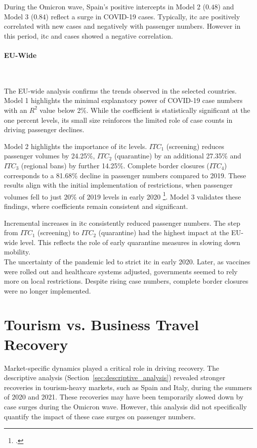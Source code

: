 \documentclass[12pt,onehalfspacing,headsepline,oneside,openright,a4paper, fleqn]{report}
\begin{document}
During the Omicron wave, Spain's positive intercepts in Model 2 ($0.48$) and Model 3 ($0.84$) reflect a surge in COVID-19 cases. Typically, \gls{itc} are positively correlated with new cases and negatively with passenger numbers. However in this period, \gls{itc} and cases showed a negative correlation.

\newpage

\paragraph{EU-Wide}
\

The EU-wide analysis confirms the trends observed in the selected countries. Model 1 highlights the minimal explanatory power of COVID-19 case numbers with an $R^2$ value below 2\%. While the coefficient is statistically significant at the one percent levels, its small size reinforces the limited role of case counts in driving passenger declines.

Model 2 highlights the importance of \gls{itc} levels. $ITC_1$ (screening) reduces passenger volumes by 24.25\%, $ITC_2$ (quarantine) by an additional 27.35\% and $ITC_3$ (regional bans) by further 14.25\%. Complete border closures ($ITC_4$) corresponds to a 81.68\% decline in passenger numbers compared to 2019. These results align with the initial implementation of restrictions, when passenger volumes fell to just 20\% of 2019 levels in early 2020 \footcite[3]{IACUS2020}. Model 3 validates these findings, where coefficients remain consistent and significant.

Incremental increases in \gls{itc} consistently reduced passenger numbers. The step from $ITC_1$ (screening) to $ITC_2$ (quarantine) had the highest impact at the EU-wide level. This reflects the role of early quarantine measures in slowing down mobility. 
\\

The uncertainty of the pandemic led to strict \gls{itc} in early 2020. Later, as vaccines were rolled out and healthcare systems adjusted, governments seemed to rely more on local restrictions. Despite rising case numbers, complete border closures were no longer implemented. 


\section{Tourism vs. Business Travel Recovery}

Market-specific dynamics played a critical role in driving recovery. The descriptive analysis (Section~\ref{sec:descriptive_analysis}) revealed stronger recoveries in tourism-heavy markets, such as Spain and Italy, during the summers of 2020 and 2021. These recoveries may have been temporarily slowed down by case surges during the Omicron wave. However, this analysis did not specifically quantify the impact of these case surges on passenger numbers. 
\end{document}
